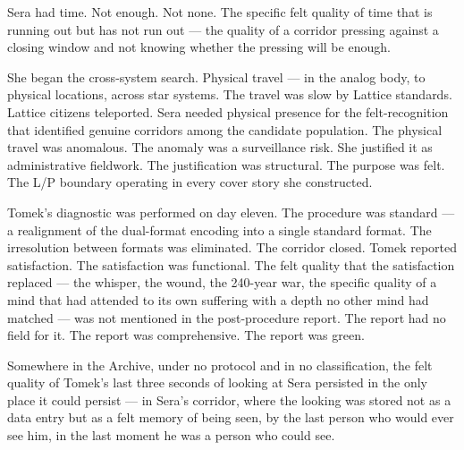 Sera had time. Not enough. Not none. The specific felt quality of time that is running out but has not run out — the quality of a corridor pressing against a closing window and not knowing whether the pressing will be enough.

She began the cross-system search. Physical travel — in the analog body, to physical locations, across star systems. The travel was slow by Lattice standards. Lattice citizens teleported. Sera needed physical presence for the felt-recognition that identified genuine corridors among the candidate population. The physical travel was anomalous. The anomaly was a surveillance risk. She justified it as administrative fieldwork. The justification was structural. The purpose was felt. The L/P boundary operating in every cover story she constructed.

Tomek's diagnostic was performed on day eleven. The procedure was standard — a realignment of the dual-format encoding into a single standard format. The irresolution between formats was eliminated. The corridor closed. Tomek reported satisfaction. The satisfaction was functional. The felt quality that the satisfaction replaced — the whisper, the wound, the 240-year war, the specific quality of a mind that had attended to its own suffering with a depth no other mind had matched — was not mentioned in the post-procedure report. The report had no field for it. The report was comprehensive. The report was green.

\begin{reflection}
Somewhere in the Archive, under no protocol and in no classification, the felt quality of Tomek's last three seconds of looking at Sera persisted in the only place it could persist — in Sera's corridor, where the looking was stored not as a data entry but as a felt memory of being seen, by the last person who would ever see him, in the last moment he was a person who could see.
\end{reflection}




